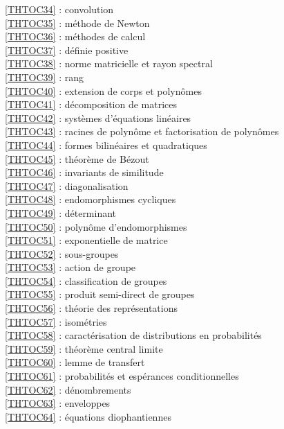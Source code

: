 \ref {THTOC34} : convolution\\
\ref {THTOC35} : méthode de Newton\\
\ref {THTOC36} : méthodes de calcul\\
\ref {THTOC37} : définie positive\\
\ref {THTOC38} : norme matricielle et rayon spectral\\
\ref {THTOC39} : rang\\
\ref {THTOC40} : extension de corps et polynômes\\
\ref {THTOC41} : décomposition de matrices\\
\ref {THTOC42} : systèmes d'équations linéaires\\
\ref {THTOC43} : racines de polynôme et factorisation de polynômes\\
\ref {THTOC44} : formes bilinéaires et quadratiques\\
\ref {THTOC45} : théorème de Bézout\\
\ref {THTOC46} : invariants de similitude\\
\ref {THTOC47} : diagonalisation\\
\ref {THTOC48} : endomorphismes cycliques\\
\ref {THTOC49} : déterminant\\
\ref {THTOC50} : polynôme d'endomorphismes\\
\ref {THTOC51} : exponentielle de matrice\\
\ref {THTOC52} : sous-groupes\\
\ref {THTOC53} : action de groupe\\
\ref {THTOC54} : classification de groupes\\
\ref {THTOC55} : produit semi-direct de groupes\\
\ref {THTOC56} : théorie des représentations\\
\ref {THTOC57} : isométries\\
\ref {THTOC58} : caractérisation de distributions en probabilités\\
\ref {THTOC59} : théorème central limite\\
\ref {THTOC60} : lemme de transfert\\
\ref {THTOC61} : probabilités et espérances conditionnelles\\
\ref {THTOC62} : dénombrements\\
\ref {THTOC63} : enveloppes\\
\ref {THTOC64} : équations diophantiennes\\
